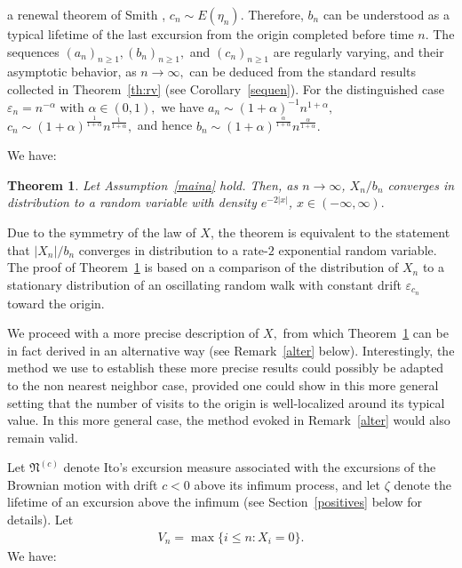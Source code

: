 \documentclass[12pt]{amsart}
\newtheorem{theorem}{Theorem} \makeatletter
\begin{document}
a renewal theorem of Smith \cite{smith}, $c_n \sim E (\eta_n)$.
Therefore, $b_n$ can be understood as a typical lifetime of the last
excursion from the origin completed before time $n$. The sequences
$(a_n)_{n\ge 1},(b_n)_{n\ge 1},$ and $(c_n)_{n\ge 1}$ are regularly
varying, and their asymptotic behavior, as $n\to\infty,$ can be
deduced from the standard results collected in Theorem~\ref{th:rv}
(see Corollary~\ref{sequen}). For the distinguished case
${\varepsilon}_n=n^{-\alpha}$ with $\alpha\in(0,1),$ we have  $a_n \sim
(1+\alpha)^{-1}n^{1+\alpha},$ $c_n\sim
(1+\alpha)^{\frac{1}{1+\alpha}}n^{\frac{1}{1+\alpha}},$ and hence
$b_n
\sim(1+\alpha)^{\frac{\alpha}{1+\alpha}}n^{\frac{\alpha}{1+\alpha}}.$
\par
We have:
\begin{theorem}
\label{walk}
Let Assumption~\ref{maina} hold. Then, as $n\to\infty$,
$X_n/b_n$ converges in distribution to a random variable with
density $e^{-2|x|}$, $x\in (-\infty,\infty).$
\par
\end{theorem}
Due to the symmetry of the law of $X$, the theorem is equivalent to
the statement that $|X_n|/b_n$ converges in distribution to a
rate-$2$ exponential random variable. The proof of
Theorem~\ref{walk} is based on a comparison of the distribution of
$X_n$ to a stationary distribution of an oscillating random walk
with constant drift ${\varepsilon}_{c_{n}}$ toward the origin.
\par
We proceed with a more precise description of $X,$ from which
Theorem~\ref{walk} can be in fact derived in an alternative way (see
Remark~\ref{alter} below). Interestingly, the method we use to
establish these more precise results could possibly be adapted to
the non nearest neighbor case, provided one could show in this more
general setting that the number of visits to the origin is
well-localized around its typical value. In this more general case,
the method evoked in Remark~\ref{alter} would also remain valid.
\par
Let ${{\mathfrak N}}^{(c)}$ denote Ito's excursion measure associated with the
excursions of the Brownian motion with drift $c<0$ above its infimum
process, and let $\zeta$ denote the lifetime of an excursion above
the infimum (see Section~\ref{positives} below for details). Let
\begin{eqnarray*} V_n=\max\{i\leq n: X_i=0\}. \end{eqnarray*} We have:
\end{document}
